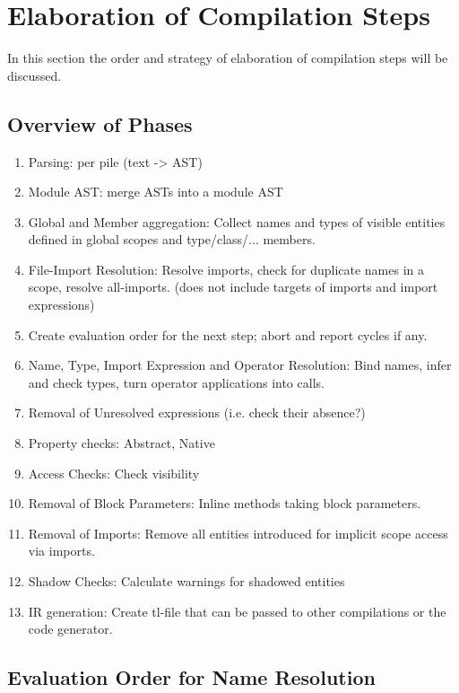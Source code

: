 \section{Elaboration of Compilation Steps}

In this section the order and strategy of elaboration of compilation steps will be discussed.

\subsection{Overview of Phases}

\begin{enumerate}
	\item Parsing: per pile (text -> AST)
	\item Module AST: merge ASTs into a module AST
	\item Global and Member aggregation: Collect names and types of visible entities defined in global scopes and type/class/... members.
    \item File-Import Resolution: Resolve imports, check for duplicate names in a scope, resolve all-imports. (does not include targets of imports and import expressions)
	\item Create evaluation order for the next step; abort and report cycles if any.
	\item Name, Type, Import Expression and Operator Resolution: Bind names, infer and check types, turn operator applications into calls.
    \item Removal of Unresolved expressions (i.e. check their absence?)
	\item Property checks: Abstract, Native
	\item Access Checks: Check visibility
	\item Removal of Block Parameters: Inline methods taking block parameters.
	\item Removal of Imports: Remove all entities introduced for implicit scope access via imports.
	\item Shadow Checks: Calculate warnings for shadowed entities
	\item IR generation: Create tl-file that can be passed to other compilations or the code generator.
\end{enumerate}

\subsection{Evaluation Order for Name Resolution}

